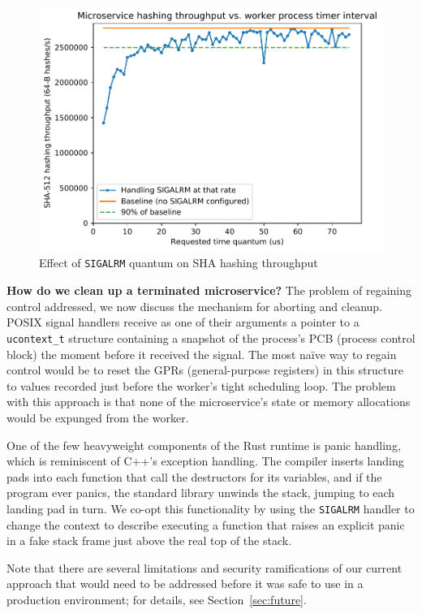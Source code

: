 \begin{figure}
\includegraphics[width=\columnwidth]{figs/2018-02-02-evaluation_quantum-hasher_throughput-throughput}
\caption{Effect of \texttt{SIGALRM} quantum on SHA hashing throughput}
\label{fig:hashtput}
\end{figure}

\textbf{How do we clean up a terminated microservice?}
The problem of regaining control addressed, we now discuss the mechanism for aborting
and cleanup.  POSIX signal handlers receive as one of their arguments a pointer to a
\texttt{ucontext\_t} structure containing a snapshot of the process's PCB (process
control block) the moment before it received the signal.  The most na\"ive way to
regain control would be to reset the GPRs (general-purpose registers) in this
structure to values recorded just before the worker's tight scheduling loop.  The
problem with this approach is that none of the microservice's state or memory
allocations would be expunged from the worker.

One of the few heavyweight components of the Rust runtime is panic handling, which is
reminiscent of C++'s exception handling.  The compiler inserts landing pads into each
function that call the destructors for its variables, and if the program ever panics,
the standard library unwinds the stack, jumping to each landing pad in turn.  We
co-opt this functionality by using the \texttt{SIGALRM} handler to change the context
to describe executing a function that raises an explicit panic in a fake stack frame
just above the real top of the stack.

Note that there are several limitations and security ramifications of our current
approach that would need to be addressed before it was safe to use in a production
environment; for details, see Section~\ref{sec:future}.

